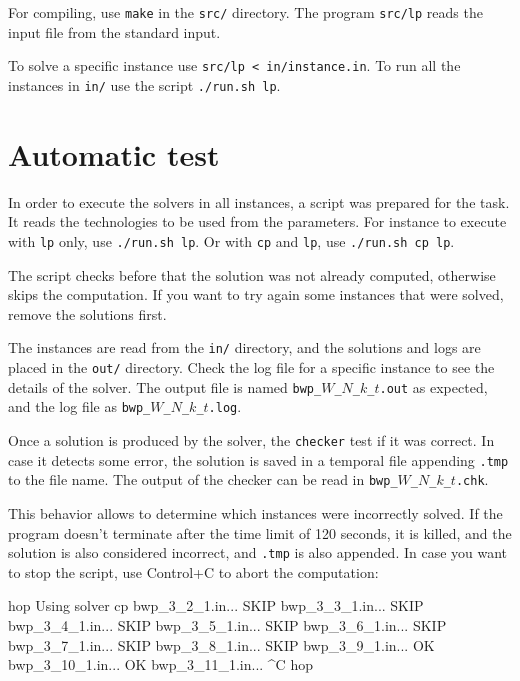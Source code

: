 \documentclass[a4paper]{article}
\begin{document}
For compiling, use \texttt{make} in the \texttt{src/} directory. The program 
\texttt{src/lp} reads the input file from the standard input.

To solve a specific instance use \texttt{src/lp < in/instance.in}. To run all 
the instances in \texttt{in/} use the script \texttt{./run.sh lp}.

\section{Automatic test}

In order to execute the solvers in all instances, a script was prepared for the 
task. It reads the technologies to be used from the parameters. For instance to 
execute with \texttt{lp} only, use \texttt{./run.sh lp}. Or with \texttt{cp} and 
\texttt{lp}, use \texttt{./run.sh cp lp}.

The script checks before that the solution was not already computed, otherwise 
skips the computation. If you want to try again some instances that were solved, 
remove the solutions first.

The instances are read from the \texttt{in/} directory, and the solutions and 
logs are placed in the \texttt{out/} directory. Check the log file for a 
specific instance to see the details of the solver. The output file is named 
\texttt{bwp\_$W$\_$N$\_$k$\_$t$.out} as expected, and the log file as 
\texttt{bwp\_$W$\_$N$\_$k$\_$t$.log}.

Once a solution is produced by the solver, the \texttt{checker} test if it was 
correct. In case it detects some error, the solution is saved in a temporal file 
appending \texttt{.tmp} to the file name. The output of the checker can be read 
in \texttt{bwp\_$W$\_$N$\_$k$\_$t$.chk}.

This behavior allows to determine which instances were incorrectly solved. If 
the program doesn't terminate after the time limit of 120 seconds, it is killed, 
and the solution is also considered incorrect, and \texttt{.tmp} is also 
appended. In case you want to stop the script, use Control+C to abort the 
computation:
%
\begin{textcode}
hop%
Using solver cp
bwp_3_2_1.in... SKIP
bwp_3_3_1.in... SKIP
bwp_3_4_1.in... SKIP
bwp_3_5_1.in... SKIP
bwp_3_6_1.in... SKIP
bwp_3_7_1.in... SKIP
bwp_3_8_1.in... SKIP
bwp_3_9_1.in... OK
bwp_3_10_1.in... OK
bwp_3_11_1.in... ^C
hop%
\end{textcode}
\end{document}
